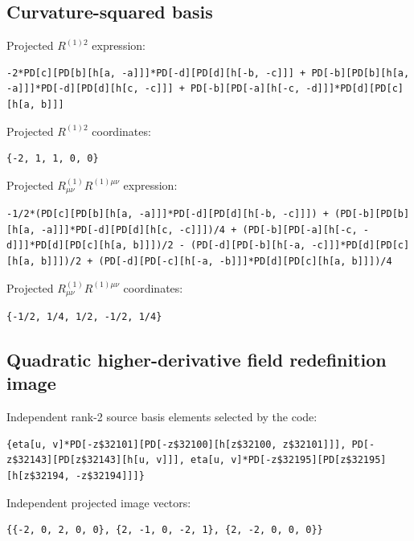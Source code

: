\documentclass[11pt]{article}
\begin{document}
\subsection{Curvature-squared basis}
Projected $R^{(1)2}$ expression:
\begin{verbatim}
-2*PD[c][PD[b][h[a, -a]]]*PD[-d][PD[d][h[-b, -c]]] + PD[-b][PD[b][h[a, -a]]]*PD[-d][PD[d][h[c, -c]]] + PD[-b][PD[-a][h[-c, -d]]]*PD[d][PD[c][h[a, b]]]
\end{verbatim}
Projected $R^{(1)2}$ coordinates:
\begin{verbatim}
{-2, 1, 1, 0, 0}
\end{verbatim}
Projected $R^{(1)}_{\mu\nu}R^{(1)\mu\nu}$ expression:
\begin{verbatim}
-1/2*(PD[c][PD[b][h[a, -a]]]*PD[-d][PD[d][h[-b, -c]]]) + (PD[-b][PD[b][h[a, -a]]]*PD[-d][PD[d][h[c, -c]]])/4 + (PD[-b][PD[-a][h[-c, -d]]]*PD[d][PD[c][h[a, b]]])/2 - (PD[-d][PD[-b][h[-a, -c]]]*PD[d][PD[c][h[a, b]]])/2 + (PD[-d][PD[-c][h[-a, -b]]]*PD[d][PD[c][h[a, b]]])/4
\end{verbatim}
Projected $R^{(1)}_{\mu\nu}R^{(1)\mu\nu}$ coordinates:
\begin{verbatim}
{-1/2, 1/4, 1/2, -1/2, 1/4}
\end{verbatim}
\subsection{Quadratic higher-derivative field redefinition image}
Independent rank-2 source basis elements selected by the code:
\begin{verbatim}
{eta[u, v]*PD[-z$32101][PD[-z$32100][h[z$32100, z$32101]]], PD[-z$32143][PD[z$32143][h[u, v]]], eta[u, v]*PD[-z$32195][PD[z$32195][h[z$32194, -z$32194]]]}
\end{verbatim}
Independent projected image vectors:
\begin{verbatim}
{{-2, 0, 2, 0, 0}, {2, -1, 0, -2, 1}, {2, -2, 0, 0, 0}}
\end{verbatim}
\end{document}
